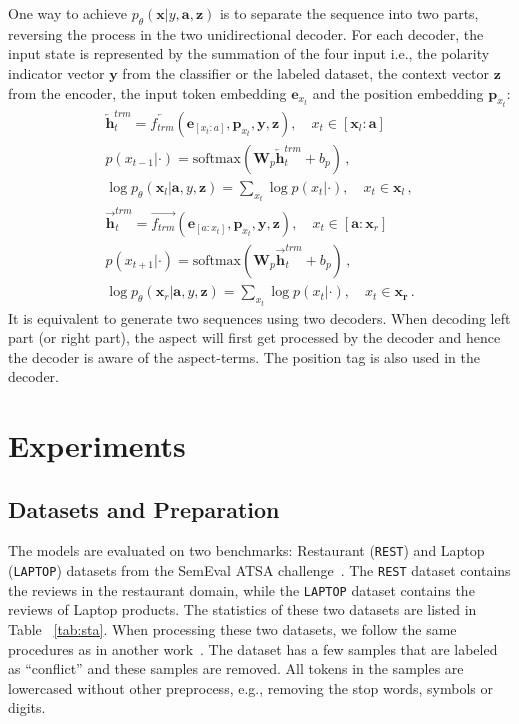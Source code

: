 \documentclass[11pt,a4paper]{article}
\begin{document}
One way to achieve $p_\theta(\mathbf{x}|y, \mathbf{a}, \mathbf{z})$ is to separate the sequence into two parts, reversing the process in the two unidirectional decoder.
For each decoder, the input state is represented by the summation of the four input i.e., the polarity indicator vector $\mathbf{y}$ from the classifier or the labeled dataset, the context vector $\textbf{z}$ from the encoder, the input token embedding $\mathbf{e}_{x_t}$ and the position embedding $\mathbf{p}_{x_t}$:
\begin{align}
\overleftarrow{\mathbf{h}}^{trm}_t = \overleftarrow{f_{trm}}(\mathbf{e}_{[x_t:a]}, \mathbf{p}_{x_t}, \mathbf{y}, \mathbf{z}), \quad x_t \in [\mathbf{x}_l : \mathbf{a}] \nonumber\\
	p({x}_{t-1}|\cdot) = \text{softmax}(\textbf{W}_p \overleftarrow{\textbf{h}}^{trm}_t + b_p) \,, \nonumber\\
	\log p_\theta(\mathbf{x}_l|\mathbf{a}, {y}, \mathbf{z}) = \sum_{x_t} \log p(x_t|\cdot), \quad x_t \in \mathbf{x}_l \,, \nonumber\\
	\overrightarrow{\textbf{h}}^{trm}_t = \overrightarrow{f_{trm}}(\mathbf{e}_{[a:x_t]}, \mathbf{p}_{x_t}, \mathbf{y}, \mathbf{z}), \quad x_t \in [\mathbf{a} : \mathbf{x}_r] \nonumber\\
	p({x}_{t+1}|\cdot) = \text{softmax}(\textbf{W}_p \overrightarrow{\textbf{h}}^{trm}_t + b_p) \,, \nonumber\\
	\log p_\theta(\mathbf{x}_r|\mathbf{a}, {y}, \mathbf{z}) = \sum_{x_t} \log p(x_t|\cdot), \quad x_t \in \mathbf{\mathbf{x}_r}  \,.\nonumber
\end{align}
It is equivalent to generate two sequences using two decoders.
When decoding left part (or right part), the aspect will first get processed by the decoder and hence the decoder is aware of the aspect-terms.
The position tag is also used in the decoder.










\section{Experiments}
\subsection{Datasets and Preparation}
The models are evaluated on two benchmarks: Restaurant (\texttt{REST}) and Laptop (\texttt{LAPTOP}) datasets from the SemEval ATSA challenge~\cite{DBLP:conf/semeval/PontikiGPPAM14}.
The \texttt{REST} dataset contains the reviews in the restaurant domain, while the \texttt{LAPTOP} dataset contains the reviews of Laptop products.
The statistics of these two datasets are listed in Table ~\ref{tab:sta}.
When processing these two datasets, we follow the same procedures as in another work~\cite{DBLP:conf/acl/LamLSB18}.
The dataset has a few samples that are labeled as ``conflict'' and these samples are removed.
All tokens in the samples are lowercased without other preprocess, e.g., removing the stop words, symbols or digits.
\end{document}
